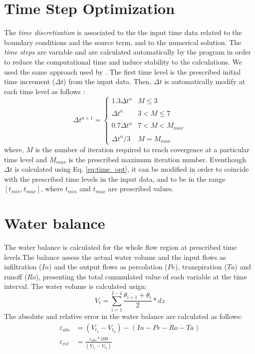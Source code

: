 \documentclass[a4paper,12pt]{article}
\begin{document}
\section{Time Step Optimization}
The \emph{time discretization} is associated to the the input time data related to the boundary conditions and the source term, and to the numerical solution. The \emph{time steps} are variable and are calculated automatically by the program in order to reduce the computational time and induce stability to the calculations.
We used the same approach used by \cite{Hydrus1d}. The first time level is the prescribed initial time increment ($\Delta t$) from the input data. Then, $\Delta t$ is automatically modify at each time level as follows \citep{Hydrus1d}:
\begin{equation} \label{eq:time_opt}
  \Delta t^{n+1}=%
  \begin{cases}
    1.3\Delta t^n & M\leq3 \\
    \\
    \Delta t^n & 3<M\leq7 \\
    \\
  	0.7\Delta t^n & 7<M<M_{max} \\
  	\\
  	\Delta t^n/3 & M=M_{max}
  \end{cases}
\end{equation}
where, $M$ is the number of iteration required to reach covergence at a particular time level and $M_{max}$ is the prescribed maximum iteration number. Eventhough $\Delta t$ is calculated using Eq. \ref{eq:time_opt}, it can be modified in order to coincide with the prescribed time levels in the input data, and to be in the range $[t_{min},t_{max}]$, where $t_{min}$ and $t_{max}$ are prescribed values.
\section{Water balance}
The water balance is calculated for the whole flow region at prescribed time levels.The balance assess the actual water volume and the input flows as infiltration ($In$) and the output flows as percolation ($Pe$), transpiration ($Ta$) and runoff ($Ro$), presenting the total cummulated value of each variable at the time interval.  The water volume is calculated usign:
\begin{equation} \label{eq:wb_vol}
    V_t=\sum\limits_{i=1}^{I-1}\frac{\theta_{i+1}+\theta_i}{2}*dz
\end{equation}
The absolute and relative error in the water balance are calculated as follows:
\begin{align} \label{eq:wb_er}
    \varepsilon_{abs} &=\left(V_{t_1}-V_{t_2}\right)-\left(In-Pe-Ro-Ta\right) \nonumber \\
    \varepsilon_{rel} &=\frac{\varepsilon_{abs}*100}{\left(V_{t_1}-V_{t_2}\right)}
\end{align}


\end{document}
